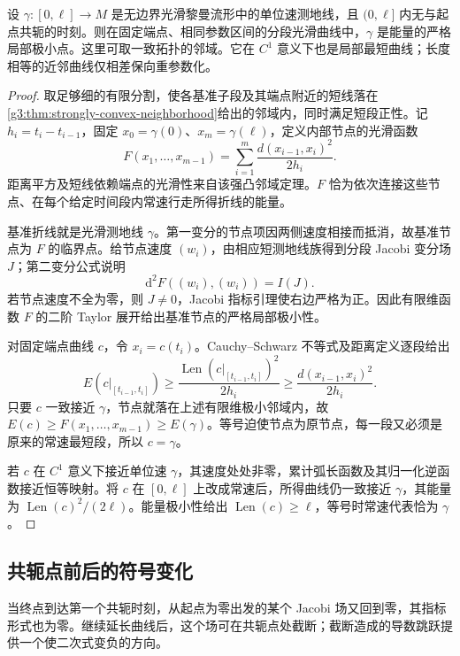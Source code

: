 \begin{proposition}\label{g3:prop:nonconjugate-local-minimum}
	设 \(\gamma:[0,\ell]\to M\) 是无边界光滑黎曼流形中的单位速测地线，且 \((0,\ell]\) 内无与起点共轭的时刻。则在固定端点、相同参数区间的分段光滑曲线中，\(\gamma\) 是能量的严格局部极小点。这里可取一致拓扑的邻域。它在 \(C^1\) 意义下也是局部最短曲线；长度相等的近邻曲线仅相差保向重参数化。
\end{proposition}
\begin{proof}
	取足够细的有限分割，使各基准子段及其端点附近的短线落在\cref{g3:thm:strongly-convex-neighborhood}给出的邻域内，同时满足短段正性。记 \(h_i=t_i-t_{i-1}\)，固定 \(x_0=\gamma(0)\)、\(x_m=\gamma(\ell)\)，定义内部节点的光滑函数
	\[
		F(x_1,\ldots,x_{m-1})
		=\sum_{i=1}^m\frac{d(x_{i-1},x_i)^2}{2h_i}.
	\]
	距离平方及短线依赖端点的光滑性来自该强凸邻域定理。\(F\) 恰为依次连接这些节点、在每个给定时间段内常速行走所得折线的能量。

	基准折线就是光滑测地线 \(\gamma\)。第一变分的节点项因两侧速度相接而抵消，故基准节点为 \(F\) 的临界点。给节点速度 \((w_i)\)，由相应短测地线族得到分段 Jacobi 变分场 \(J\)；第二变分公式说明
	\[
		\mathrm d^2F((w_i),(w_i))=I(J).
	\]
	若节点速度不全为零，则 \(J\ne0\)，Jacobi 指标引理使右边严格为正。因此有限维函数 \(F\) 的二阶 Taylor 展开给出基准节点的严格局部极小性。

	对固定端点曲线 \(c\)，令 \(x_i=c(t_i)\)。Cauchy--Schwarz 不等式及距离定义逐段给出
	\[
		E(c|_{[t_{i-1},t_i]})
		\ge\frac{\operatorname{Len}(c|_{[t_{i-1},t_i]})^2}{2h_i}
		\ge\frac{d(x_{i-1},x_i)^2}{2h_i}.
	\]
	只要 \(c\) 一致接近 \(\gamma\)，节点就落在上述有限维极小邻域内，故 \(E(c)\ge F(x_1,\ldots,x_{m-1})\ge E(\gamma)\)。等号迫使节点为原节点，每一段又必须是原来的常速最短段，所以 \(c=\gamma\)。

	若 \(c\) 在 \(C^1\) 意义下接近单位速 \(\gamma\)，其速度处处非零，累计弧长函数及其归一化逆函数接近恒等映射。将 \(c\) 在 \([0,\ell]\) 上改成常速后，所得曲线仍一致接近 \(\gamma\)，其能量为 \(\operatorname{Len}(c)^2/(2\ell)\)。能量极小性给出 \(\operatorname{Len}(c)\ge\ell\)，等号时常速代表恰为 \(\gamma\)。
\end{proof}

\subsection{共轭点前后的符号变化}
\label{g3:subsec:0603:03}

当终点到达第一个共轭时刻，从起点为零出发的某个 Jacobi 场又回到零，其指标形式也为零。继续延长曲线后，这个场可在共轭点处截断；截断造成的导数跳跃提供一个使二次式变负的方向。

